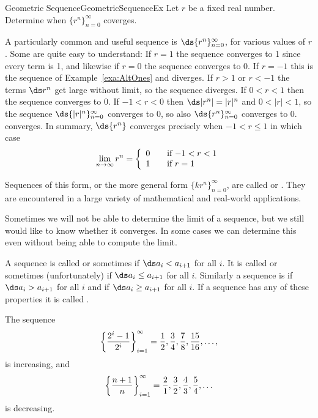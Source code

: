 \begin{example}{Geometric Sequence}{GeometricSequenceEx}
Let $r$ be a fixed real number. Determine when $\{r^n\}_{n=0}^{\infty}$ coverges.
\end{example}
\begin{solution}
A particularly common and useful sequence is $\ds \{r^n\}_{n=0}^\infty$,
for various values of $r$. Some are quite easy to understand: If $r=1$
the sequence converges to 1 since every term is 1, and likewise if
$r=0$ the sequence converges to 0. If $r=-1$ this is
the sequence of Example~\ref{exa:AltOnes} and
diverges. If $r>1$ or $r<-1$ the terms $\ds r^n$ get large without limit,
so the sequence diverges. If $0<r<1$ then the sequence converges to
0. If $-1<r<0$ then $\ds |r^n|=|r|^n$ and $0<|r|<1$, so the sequence
$\ds \{|r|^n\}_{n=0}^\infty$ converges to 0, so also 
$\ds\{r^n\}_{n=0}^\infty$ converges to 0.
converges. In summary, $\ds \{r^n\}$ converges precisely when
$-1<r\le1$ in which case
\[
\lim_{n\to\infty} r^n=\left\{
\begin{array}{l l}
0 & \quad \text{if $-1<r<1$}\\
1 & \quad \text{if $r=1$}
\end{array}\right.
\]
\end{solution}

Sequences of this form, or the more general form $\{kr^n\}_{n=0}^{\infty}$, are called  or . They are encountered in a large variety of mathematical and real-world applications.

Sometimes we will not be able to determine the limit of a sequence,
but we still would like to know whether it converges. In some cases we
can determine this even without being able to compute the limit.

A sequence is called 
or sometimes  if $\ds a_i<a_{i+1}$ for all
$i$. It is called  or sometimes
(unfortunately)  if $\ds a_i\le a_{i+1}$ for all
$i$. Similarly a sequence is  if $\ds a_i>a_{i+1}$ for all $i$
and  if
$\ds a_i\ge a_{i+1}$ for all $i$. If a sequence has any of these
properties it is called .

\begin{example}{}{}
The sequence
$$
  \left\{{2^i-1\over2^i}\right\}_{i=1}^\infty=
  {1\over2},{3\over4},{7\over8},{15\over16},\ldots,
$$
is increasing, and
$$ 
  \left\{{n+1\over n}\right\}_{i=1}^\infty=
  {2\over1},{3\over2},{4\over3},{5\over4},\ldots
$$
is decreasing.
\end{example}

